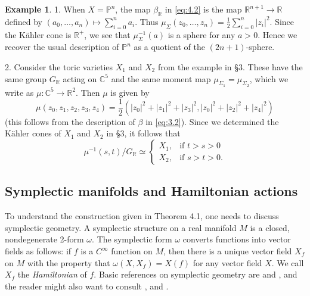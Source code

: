 \documentclass{amsart}
\theoremstyle{plain}
\theoremstyle{definition}
\newtheorem*{example}{Example}
\begin{document}
\begin{example} 1. When $X = \mathbb{P}^n$, the map $\beta_{\mathbb{R}}$ in \eqref{eq:4.2} is the map $\mathbb{R}^{n+1} \to \mathbb{R}$ defined
by $(a_0,\dots,a_n) \mapsto \sum_{i=0}^n a_i$.  Thus
$\mu_\Sigma(z_0,\dots,z_n) = \frac{1}{2}\sum_{i=0}^n |z_i|^2$.  Since
the K\"ahler cone is $\mathbb{R}^+$, we see that $\mu_\Sigma^{-1}(a)$ is
a sphere for any $a > 0$.  Hence we recover the usual description of
$\mathbb{P}^n$ as a quotient of the $(2n+1)$-sphere.

	2. Consider the toric varieties $X_1$ and $X_2$ from the
example in \S3.  These have the same group $G_{\mathbb{R}}$ acting on
$\mathbb{C}^5$ and the same moment map $\mu_{\Sigma_1} =
\mu_{\Sigma_2}$, which we write as $\mu : \mathbb{C}^5 \to \mathbb{R}^2$.
Then $\mu$ is given by
\[
\mu(z_0,z_1,z_2,z_3,z_4) ={\textstyle{\frac{1}{2}}} (|z_0|^2 +
|z_1|^2 + |z_3|^2, |z_0|^2 + |z_2|^2 + |z_4|^2)
\]
(this follows from the description of $\beta$ in \eqref{eq:3.2}).  Since
we determined the K\"ahler cones of $X_1$ and $X_2$ in \S3, it follows
that 
\[
\mu^{-1}(s,t)/G_{\mathbb{R}} \simeq \begin{cases} X_1, &\text{if $t > s >
0$}\\ X_2, &\text{if $s > t > 0$.}\end{cases}
\]
\end{example} 

	\subsection{Symplectic manifolds and Hamiltonian actions} To understand the construction given in Theorem
4.1, one needs to discuss symplectic geometry.  A symplectic structure
on a real manifold $M$ is a closed, nondegenerate 2-form $\omega$.
The symplectic form $\omega$ converts functions into vector fields as
follows: if $f$ is a $C^\infty$ function on $M$, then there is a
unique vector field $X_f$ on $M$ with the property that $\omega(X,X_f)
= X(f)$ for any vector field $X$.  We call $X_f$ the {\it
Hamiltonian\/} of $f$.  Basic references on symplectic geometry are
\cite{Aud} and \cite{Kir}, and the reader might also want to consult
\cite{Ati1}, \cite{Ati2} and \cite{GS}.
\end{document}
